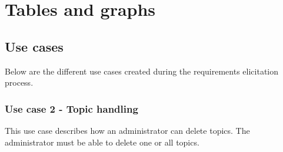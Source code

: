\chapter{Tables and graphs}
\label{ch:tables_and_graphs}

\section{Use cases}
\label{sec:use_cases_appendix}

Below are the different use cases created during the requirements elicitation process.

\subsection{Use case 2 - Topic handling}
\label{subsec:requirements_engineering-use_cases-topic_handling}

This use case describes how an administrator can delete topics. The administrator must be able to delete one or all topics.

